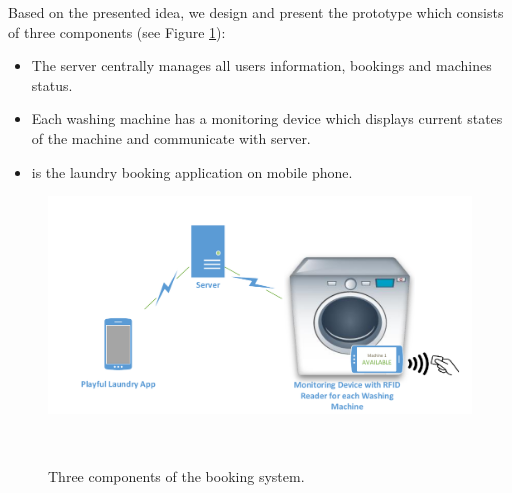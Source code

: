 Based on the presented idea, we design and present the prototype which consists of three components (see Figure \ref{fig:figure1}):
\begin{itemize}
\item The server centrally manages all users information, bookings and machines status.
\item Each washing machine has a monitoring device which displays current states of the machine and communicate with server.
\item {\toolname} is the laundry booking application on mobile phone.
\end{itemize}
\begin{figure}[h]
\centering
  \includegraphics[width=\columnwidth]{figures/overview}
  \caption{Three components of the booking system.}~\label{fig:figure1}
\end{figure}
